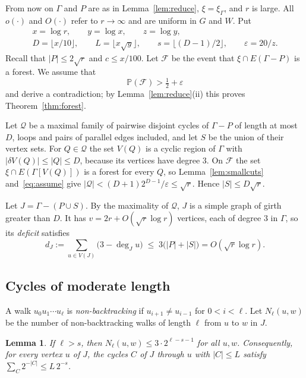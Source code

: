 \documentclass[11pt]{article}
\newtheorem{lemma}[theorem]{Lemma}
\theoremstyle{definition}
\theoremstyle{remark}
\newcommand{\PP}{\mathbb{P}}
\begin{document}
From now on $\Gamma$ and $P$ are as in Lemma~\ref{lem:reduce}, $\xi=\xi_\Gamma$, and $r$ is large.
All $o(\cdot)$ and $O(\cdot)$ refer to $r\to\infty$ and are uniform in $G$ and $W$. Put
\begin{gather*}
  x=\log r,\qquad y=\log x,\qquad z=\log y,\\
  D=\lfloor x/10\rfloor,\qquad L=\lfloor x\sqrt y\rfloor,\qquad
  s=\lfloor(D-1)/2\rfloor,\qquad\varepsilon=20/z .
\end{gather*}
Recall that $|P|\le2\sqrt r$ and $c\le x/100$. Let $\mathcal{F}$ be the event that
$\xi\cap E(\Gamma-P)$ is a forest. We assume that
\begin{equation}\label{eq:assume}
  \PP(\mathcal{F})>\tfrac12+\varepsilon
\end{equation}
and derive a contradiction; by Lemma~\ref{lem:reduce}(ii) this proves Theorem~\ref{thm:forest}.

Let $\mathcal{Q}$ be a maximal family of pairwise disjoint cycles of $\Gamma-P$ of length at most $D$,
loops and pairs of parallel edges included, and let $S$ be the union of their vertex sets. For
$Q\in\mathcal{Q}$ the set $V(Q)$ is a cyclic region of $\Gamma$ with $|\delta V(Q)|\le|Q|\le D$,
because its vertices have degree $3$. On $\mathcal{F}$ the set $\xi\cap E(\Gamma[V(Q)])$ is a forest
for every $Q$, so Lemma~\ref{lem:smallcuts} and~\eqref{eq:assume} give
$|\mathcal{Q}|<(D+1)2^{D-1}/\varepsilon\le\sqrt r$. Hence $|S|\le D\sqrt r$.

Let $J=\Gamma-(P\cup S)$. By the maximality of $\mathcal{Q}$, $J$ is a simple graph of girth greater
than $D$. It has $v=2r+O(\sqrt r\log r)$ vertices, each of degree $3$ in $\Gamma$, so its
\emph{deficit} satisfies
\begin{equation}\label{eq:deficit}
  d_J:=\sum_{u\in V(J)}\bigl(3-\deg_Ju\bigr)\;\le\;3\bigl(|P|+|S|\bigr)=O(\sqrt r\log r).
\end{equation}

\subsection{Cycles of moderate length}

A walk $u_0u_1\cdots u_\ell$ is \emph{non-backtracking} if $u_{i+1}\ne u_{i-1}$ for $0<i<\ell$. Let
$N_\ell(u,w)$ be the number of non-backtracking walks of length $\ell$ from $u$ to $w$ in $J$.

\begin{lemma}\label{lem:walks}
If $\ell>s$, then $N_\ell(u,w)\le3\cdot2^{\ell-s-1}$ for all $u,w$. Consequently, for every vertex
$u$ of $J$, the cycles $C$ of $J$ through $u$ with $|C|\le L$ satisfy $\sum_C2^{-|C|}\le L\,2^{-s}$.
\end{lemma}
\end{document}
